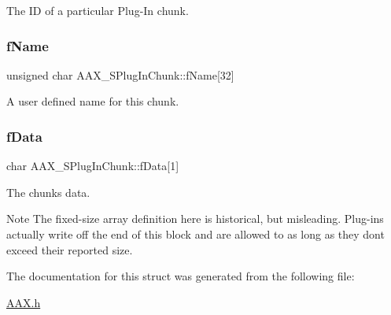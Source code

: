 The ID of a particular Plug-\/\+In chunk. 

\mbox{\label{a01421_a1b07e29358b5549739f674e04653a6bc}} 
\subsubsection{\texorpdfstring{fName}{fName}}
{\footnotesize\ttfamily unsigned char A\+A\+X\+\_\+\+S\+Plug\+In\+Chunk\+::f\+Name\mbox{[}32\mbox{]}}



A user defined name for this chunk. 

\mbox{\label{a01421_abc76d66fffa4a59ee5cfdbdd992c532c}} 
\subsubsection{\texorpdfstring{fData}{fData}}
{\footnotesize\ttfamily char A\+A\+X\+\_\+\+S\+Plug\+In\+Chunk\+::f\+Data\mbox{[}1\mbox{]}}



The chunk\textquotesingle{}s data. 

\begin{DoxyNote}{Note}
The fixed-\/size array definition here is historical, but misleading. Plug-\/ins actually write off the end of this block and are allowed to as long as they don\textquotesingle{}t exceed their reported size. 
\end{DoxyNote}


The documentation for this struct was generated from the following file\+:\begin{DoxyCompactItemize}
\item 
\mbox{\hyperlink{a00392}{A\+A\+X.\+h}}\end{DoxyCompactItemize}

